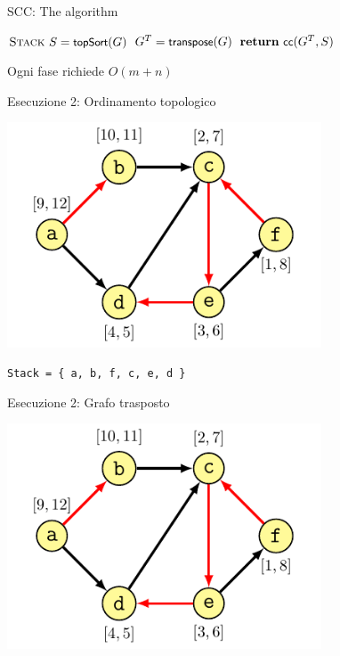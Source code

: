\begin{frame}{SCC: The algorithm}
\vspace{-12pt}
\begin{Procedure}
\caption[A]{$\INTEGER[\,]$ \scc($\Graph\ G$)}

  $\textsc{Stack}\ S = \textsf{{\small topSort}}(G)$
  $G^T = \textsf{{\small transpose}}(G)$
  $\Return\ \connectedcomponents(G^T, S)$

\end{Procedure}

\BIL
\item Ogni fase richiede $O(m+n)$
\EIL

\end{frame}

\begin{frame}{Esecuzione 2: Ordinamento topologico}

\centering\includegraphics[width=0.7\textwidth,page=1]{scc4.pdf}

\Large
\texttt{Stack = \{ a, b, f, c, e, d \} }
\end{frame}

\begin{frame}{Esecuzione 2: Grafo trasposto}

\centering\includegraphics[width=0.7\textwidth,page=3]{scc4.pdf}


\end{frame}

